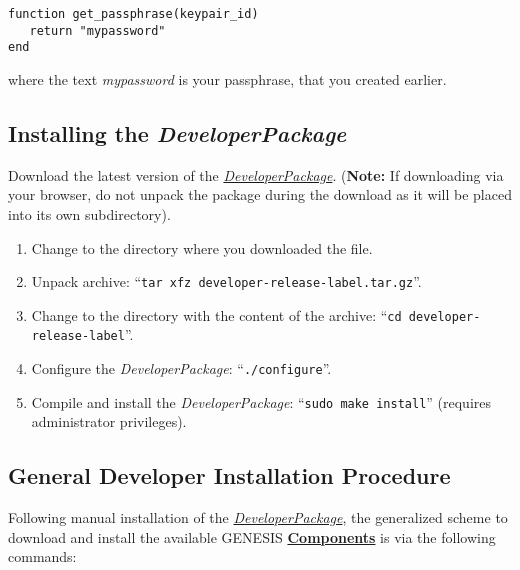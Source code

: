 \documentclass[12pt]{article}
\begin{document}
\begin{verbatim}
function get_passphrase(keypair_id)	
   return "mypassword"
end
\end{verbatim}

where the text {\it mypassword} is your passphrase, that you created earlier. 


\subsection*{Installing the {\it DeveloperPackage}}

Download the latest version of the \href{https://github.com/HugoCornelis/developer/blob/master/developer-0.0.0-alpha.tar.gz?raw=true}{{\it DeveloperPackage}}.  ({\bf Note:} If downloading via your browser, do not unpack the package during the download as it will be placed into its own subdirectory).
\begin{enumerate}
   \item Change to the directory where you downloaded the file.
   \item Unpack archive: ``{\tt tar xfz developer-release-label.tar.gz}''.
   \item Change to the directory with the content of the archive: ``{\tt cd developer-release-label}''.
   \item Configure the {\it DeveloperPackage}: ``{\tt ./configure}''.
   \item Compile and install the {\it DeveloperPackage}: ``{\tt sudo make install}'' (requires administrator privileges).
\end{enumerate}

\subsection*{General Developer Installation Procedure}

Following manual installation of the \href{../developer-package/developer-package.tex}{\it DeveloperPackage}, the generalized scheme to download and install the available GENESIS \href{../reserved-words/reserved-words.tex}{\bf Components} is via the following commands:
\end{document}
